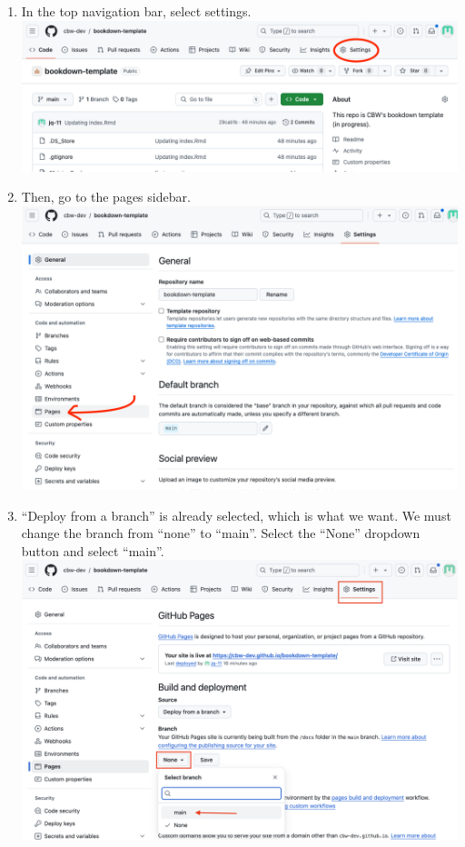 \documentclass[
]{book}
\theoremstyle{definition}
\theoremstyle{definition}
\theoremstyle{definition}
\theoremstyle{definition}
\theoremstyle{remark}
\begin{document}
\begin{enumerate}
\def\labelenumi{\arabic{enumi}.}
\item
  In the top navigation bar, select settings.
  \includegraphics{img/git-instruct/github-settings.png}
\item
  Then, go to the pages sidebar.
  \includegraphics{img/git-instruct/github-select-pages.png}
\item
  ``Deploy from a branch'' is already selected, which is what we want. We must change the branch from ``none'' to ``main''. Select the ``None'' dropdown button and select ``main''.
  \includegraphics{img/git-instruct/github-deploy-main.png}\\

\end{enumerate}
\end{document}
